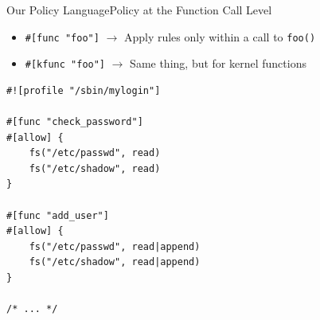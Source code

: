 \documentclass[12pt, dvipsnames, aspectratio=169]{beamer}
\begin{document}
%
%
%

\begin{frame}[c, fragile]{Our Policy Language}{Policy at the Function Call Level}
\begin{itemize}
    \item \lstinline[language=bpfbox]|#[func "foo"]|  $\rightarrow$ Apply rules only within a call to \texttt{foo()}
    \item \lstinline[language=bpfbox]|#[kfunc "foo"]|  $\rightarrow$ Same thing, but for kernel functions
\end{itemize}
\vfill
\begin{lstlisting}[language=bpfbox, xleftmargin=.25\textwidth]
#![profile "/sbin/mylogin"]

#[func "check_password"]
#[allow] {
    fs("/etc/passwd", read)
    fs("/etc/shadow", read)
}

#[func "add_user"]
#[allow] {
    fs("/etc/passwd", read|append)
    fs("/etc/shadow", read|append)
}

/* ... */
\end{lstlisting}
\end{frame}

%
\end{document}
